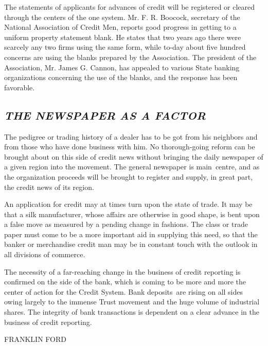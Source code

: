 \documentclass[openany,nobib]{tufte-book}
\begin{document}
The statements of applicants for advances of credit will be registered
or cleared through the centers of the one system. Mr. F. R. Boocock,
secretary of the National Association of Credit Men, reports good
progress in getting to a uniform property statement blank. He states
that two years ago there were scarcely any two firms using the same
form, while to-day about five hundred concerns are using the blanks
prepared by the Association. The president of the Association, Mr. James
G. Cannon, has appealed to various State banking organizations
concerning the use of the blanks, and the response has been favorable.~

\hypertarget{the-newspaper-as-a-factor}{%
\subsection{\texorpdfstring{\emph{THE NEWSPAPER AS A
FACTOR}}{THE NEWSPAPER AS A FACTOR}}\label{the-newspaper-as-a-factor}}

The pedigree or trading history of a dealer has to be got from his
neighbors and from those who have done business with him. No
thorough-going reform can be brought about on this side of credit news
without bringing the daily newspaper of a given region into the
movement. The general newspaper is main~centre, and as the organization
proceeds will be brought to register and supply, in great part, the
credit news of its region.~

\enlargethispage{\baselineskip}

An application for credit may at times turn upon the state of trade. It
may be that a silk manufacturer, whose affairs are otherwise in good
shape, is bent upon a false move as measured by a pending change in
fashions. The class or trade paper must come to be a more important aid
in supplying this need, so that the banker or merchandise credit man may
be in constant touch with the outlook in all divisions of commerce.~

The necessity of a far-reaching change in the business of credit
reporting is confirmed on the side of the bank, which is coming to be
more and more the center of action for the Credit System. Bank
deposits~are rising on all sides owing largely to the immense Trust
movement and the huge volume of industrial shares. The integrity of bank
transactions is dependent on a clear advance in the business of credit
reporting.

\vspace{0.2in}

\hfill{\Large FRANKLIN FORD}
\end{document}
